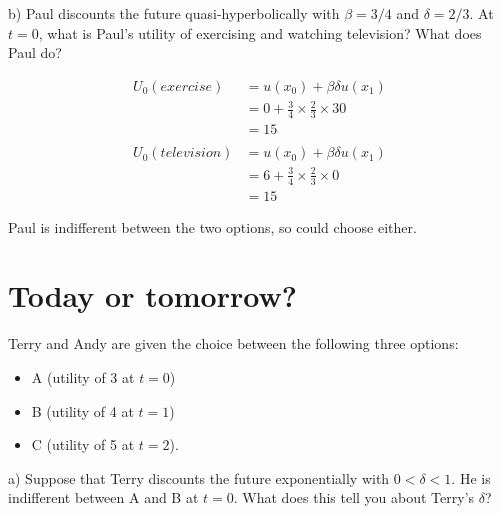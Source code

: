 \documentclass[
  letterpaper,
  DIV=11,
  numbers=noendperiod]{scrreprt}
\begin{document}
b) Paul discounts the future quasi-hyperbolically with \(\beta=3/4\) and
\(\delta=2/3\). At \(t=0\), what is Paul's utility of exercising and
watching television? What does Paul do?

\begin{tcolorbox}[enhanced jigsaw, title=\textcolor{quarto-callout-tip-color}{\faLightbulb}\hspace{0.5em}{Answer}, toprule=.15mm, colback=white, breakable, titlerule=0mm, colframe=quarto-callout-tip-color-frame, coltitle=black, opacityback=0, rightrule=.15mm, colbacktitle=quarto-callout-tip-color!10!white, bottomtitle=1mm, opacitybacktitle=0.6, arc=.35mm, bottomrule=.15mm, toptitle=1mm, leftrule=.75mm, left=2mm]

\begin{align*}
U_0(exercise)&=u(x_0)+\beta\delta u(x_1) \\
&=0+\frac{3}{4}\times \frac{2}{3}\times 30 \\
&=15 \\
\\
U_0(television)&=u(x_0)+\beta\delta u(x_1) \\
&=6+\frac{3}{4}\times \frac{2}{3}\times 0 \\
&=15
\end{align*}

Paul is indifferent between the two options, so could choose either.

\end{tcolorbox}

\hypertarget{today-or-tomorrow}{%
\section{Today or tomorrow?}\label{today-or-tomorrow}}

Terry and Andy are given the choice between the following three options:

\begin{itemize}
\item
  A (utility of 3 at \(t=0\))
\item
  B (utility of 4 at \(t=1\))
\item
  C (utility of 5 at \(t=2\)).
\end{itemize}

a) Suppose that Terry discounts the future exponentially with
\(0<\delta<1\). He is indifferent between A and B at \(t=0\). What does
this tell you about Terry's \(\delta\)?
\end{document}

